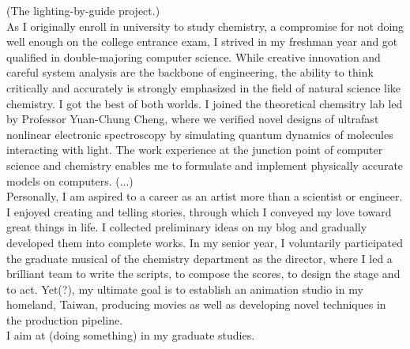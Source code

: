 \documentclass[a4paper, 12pt]{article}
\begin{document}

(The lighting-by-guide project.)\\


As I originally enroll in university to study chemistry, a compromise for not doing well enough on the college entrance exam, I strived in my freshman year and got qualified in double-majoring computer science. While creative innovation and careful system analysis are the backbone of engineering, the ability to think critically and accurately is strongly emphasized in the field of natural science like chemistry. I got the best of both worlds. I joined the theoretical chemsitry lab led by Professor Yuan-Chung Cheng, where we verified novel designs of ultrafast nonlinear electronic spectroscopy by simulating quantum dynamics of molecules interacting with light. The work experience at the junction point of computer science and chemistry enables me to formulate and implement physically accurate models on computers. (...)\\
 
 

Personally, I am aspired to a career as an artist more than a scientist or engineer. I enjoyed creating and telling stories, through which I conveyed my love toward great things in life. I collected preliminary ideas on my blog and gradually developed them into complete works. In my senior year, I voluntarily participated the graduate musical of the chemistry department as the director, where I led a brilliant team to write the scripts, to compose the scores, to design the stage and to act. Yet(?), my ultimate goal is to establish an animation studio in my homeland, Taiwan, producing movies as well as developing novel techniques in the production pipeline. \\



I aim at (doing something) in my graduate studies.\\
\end{document}
